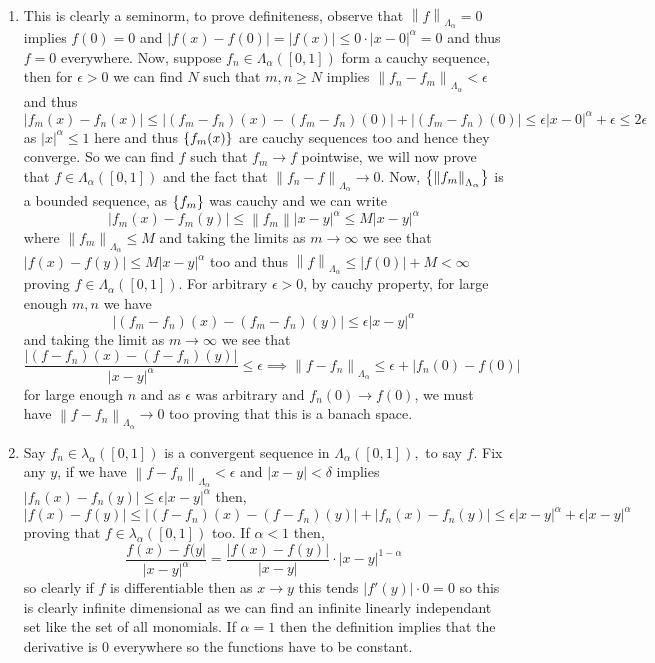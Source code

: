 \documentclass[12pt,a4paper]{article}
\begin{document}
\begin{solution}
    \begin{enumerate}[label=\alph*.]
        \item This is clearly a seminorm, to prove definiteness, observe that $ \left\|f\right\|_{\Lambda_\alpha}=0$ implies $f(0)=0$ and $|f(x)-f(0)|=|f(x)|\leq 0\cdot|x-0|^\alpha=0$ and thus $f=0$ everywhere. 
            Now, suppose $f_n\in\Lambda_{\alpha}([0,1])$ form a cauchy sequence, then for $\epsilon>0$ we can find $N$ such that $m,n\geq N$ implies $ \left\|f_n-f_m\right\|_{\Lambda_\alpha}<\epsilon$ and thus 
            \[
                |f_m(x)-f_n(x)|\leq|(f_m-f_n)(x)-(f_m-f_n)(0)|+|(f_m-f_n)(0)|\leq\epsilon|x-0|^\alpha+\epsilon\leq 2\epsilon
            \]
            as $|x|^\alpha\leq 1$ here and thus $ \qty{f_m(x)}$ are cauchy sequences too and hence they converge. 
            So we can find $f$ such that $f_m\to f$ pointwise, we will now prove that $f\in\Lambda_\alpha([0,1])$ and the fact that $ \left\|f_n-f\right\|_{\Lambda_\alpha}\to 0.$ 
            Now, $\qty{\left\|f_m\right\|_{\Lambda_\alpha}}$ is a bounded sequence, as $\qty{f_m}$ was cauchy and we can write 
            \[
                |f_m(x)-f_m(y)|\leq \left\|f_m\right\||x-y|^\alpha\leq M|x-y|^\alpha
            \]
            where $ \left\|f_m\right\|_{\Lambda_\alpha}\leq M$ and taking the limits as $m\to\infty$ we see that $|f(x)-f(y)|\leq M|x-y|^\alpha$ too and thus $ \left\|f\right\|_{\Lambda_\alpha}\leq|f(0)|+M<\infty$ proving $f\in\Lambda_\alpha([0,1]).$ 
            For arbitrary $\epsilon>0$, by cauchy property, for large enough $m,n$ we have 
            \[
                |(f_m-f_n)(x)-(f_m-f_n)(y)|\leq\epsilon|x-y|^\alpha
            \]
            and taking the limit as $m\to\infty$ we see that
            \[
                \frac{|(f-f_n)(x)-(f-f_n)(y)|}{|x-y|^\alpha}\leq\epsilon\implies \left\|f-f_n\right\|_{\Lambda_\alpha}\leq\epsilon+|f_n(0)-f(0)|
            \]
            for large enough $n$ and as $\epsilon$ was arbitrary and $f_n(0)\to f(0)$, we must have $ \left\|f-f_n\right\|_{\Lambda_\alpha}\to 0$ too proving that this is a banach space. 
        \item Say $f_n\in\lambda_\alpha([0,1])$ is a convergent sequence in $\Lambda_\alpha([0,1]),$ to say $f.$ 
            Fix any $y$, if we have $ \left\|f-f_n\right\|_{\Lambda_\alpha}<\epsilon$ and $|x-y|<\delta$ implies $|f_n(x)-f_n(y)|\leq\epsilon|x-y|^\alpha$ then, 
             \[
                 |f(x)-f(y)|\leq|(f-f_n)(x)-(f-f_n)(y)|+|f_n(x)-f_n(y)|\leq\epsilon|x-y|^\alpha+\epsilon|x-y|^\alpha
             \]
             proving that $f\in\lambda_\alpha([0,1])$ too. 
             If $\alpha<1$ then, 
             \[
                 \frac{f(x)-f(y|}{|x-y|^\alpha}= \frac{|f(x)-f(y)|}{|x-y|}\cdot|x-y|^{1-\alpha}
             \]
             so clearly if $f$ is differentiable then as $x\to y$ this tends $|f'(y)|\cdot 0=0$ so this is clearly infinite dimensional as we can find an infinite linearly independant set like the set of all monomials. 
             If $\alpha=1$ then the definition implies that the derivative is $0$ everywhere so the functions have to be constant. 
    \end{enumerate}
\end{solution}
\end{document}
